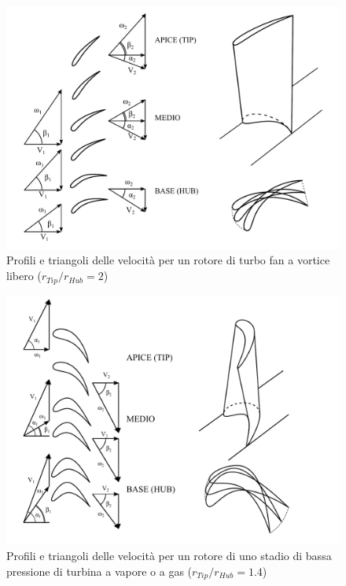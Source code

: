 \begin{figure}
\centering
  \includegraphics[width=.8\textwidth]{fig/TurboFan.pdf}
\caption{Profili e triangoli delle velocità per un rotore di turbo fan a vortice libero ($r_{Tip}/r_{Hub} =2$)}
\label{fig:TurboFan1}
\end{figure}

\begin{figure}
\centering
  \includegraphics[width=.8\textwidth]{fig/TurbVortLib.pdf}
\caption{Profili e triangoli delle velocità per un rotore di uno stadio di bassa pressione di turbina a vapore o a gas ($r_{Tip}/r_{Hub} =1.4$)}
\label{fig:TurbVortLib}
\end{figure}

